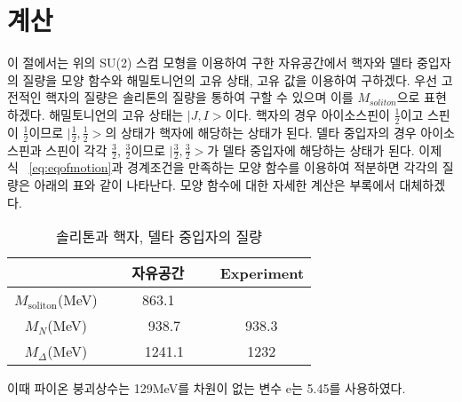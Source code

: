 \documentclass[superscriptaddress,
nofootinbib,byrevtex,fleqn,prd,12pt]{revtex4}
\begin{document}
\section{계산} \label{3}
이 절에서는 위의 SU(2) 스컴 모형을 이용하여 구한 자유공간에서 핵자와 델타 중입자의 질량을 모양 함수와 해밀토니언의 고유 상태, 고유 값을 이용하여 구하겠다.
우선 고전적인 핵자의 질량은 솔리톤의 질량을 통하여 구할 수 있으며 이를 $ M_{soliton}$으로 표현하겠다. 해밀토니언의 고유 상태는 $|J,I>$이다.
 핵자의 경우 아이소스핀이 $\frac{1}{2}$이고 스핀이 $ \frac{1}{2}$이므로 $|\frac{1}{2},\frac{1}{2}>$의 상태가 핵자에 해당하는 상태가 된다.
 델타 중입자의 경우 아이소스핀과 스핀이 각각 $\frac{3}{2}$, $\frac{3}{2} $이므로 $ |\frac{3}{2}, \frac{3}{2}>$가 델타 중입자에 해당하는 상태가 된다.
 이제 식 ~\eqref{eq:eqofmotion}과 경계조건을 만족하는 모양 함수를 이용하여 적분하면 각각의 질량은 아래의 표와 같이 나타난다.
 모양 함수에 대한 자세한 계산은 부록에서 대체하겠다.
\begin{table}[H]\label{table}
\caption{솔리톤과 핵자, 델타 중입자의 질량}
\begin{center}
\begin{large}
\begin{tabular}{c|cc}
  \hline
\hline
  &\ 자유공간 \  &\ Experiment  \\
\hline
\hline
$M_{\mathrm{soliton}}$(MeV) \ & \ 863.1 \ & \\
$M_{N}$(MeV) \ & \ 938.7 &\ 938.3 \\
$M_{\Delta}$(MeV) \ & \ 1241.1 &\ 1232 \\
\hline
\hline
\end{tabular}
\end{large}
\end{center}
\end{table}
이때 파이온 붕괴상수는 129MeV를 차원이 없는 변수 e는 5.45를 사용하였다.
\newpage
\end{document}
